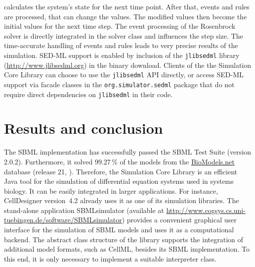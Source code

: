 \documentclass{bioinfo}
\newcommand{\jlibsedml}{\texttt{jlibsedml}}
\begin{document}
\begin{methods}
calculates the system's state for the next time point. After that, events
and rules are processed, that can change the values. The modified values then
become the initial values for the next time step. The event processing of the
Rosenbrock solver
is directly integrated in the solver class and influences the
step size. The time-accurate handling of events and rules leads to very precise
results of the simulation.
%
SED-ML support is enabled by inclusion of the \jlibsedml{} library
(\href{http://www.jlibsedml.org}{http://www.jlibsedml.org}) in the binary
download. Clients of the the Simulation Core Library can choose to use the
\jlibsedml{} API directly, or access SED-ML support via  facade classes
in the \texttt{org.simulator.sedml} package that do not require direct
dependencies on \jlibsedml{} in their code.
\end{methods}



%
%

\section{Results and conclusion}
The SBML implementation has successfully passed the
SBML Test Suite (version 2.0.2).
Furthermore, it solved 99.27\,\% of the models from the
\href{http://biomodels.net}{BioModels.net} database (release 21,
\citealp{Novere2006a}).
Therefore, the Simulation Core Library is an efficient Java tool for the
simulation of differential equation systems used in systems biology. It can be
easily integrated in larger applications. For instance,
CellDesigner version~4.2 \citep{Funahashi2003} already uses it as one of its simulation libraries.
The stand-alone application SBMLsimulator (available at
\href{http://www.cogsys.cs.uni-tuebingen.de/software/SBMLsimulator}{http://www.cogsys.cs.uni-tuebingen.de/software/SBMLsimulator})
provides a convenient graphical user interface for the simulation of SBML
models and uses it as a computational backend.
The abstract class structure of the library supports the integration of
additional model formats, such as CellML, besides its SBML implementation. To
this end, it is only necessary to implement a suitable interpreter class.
\end{document}
